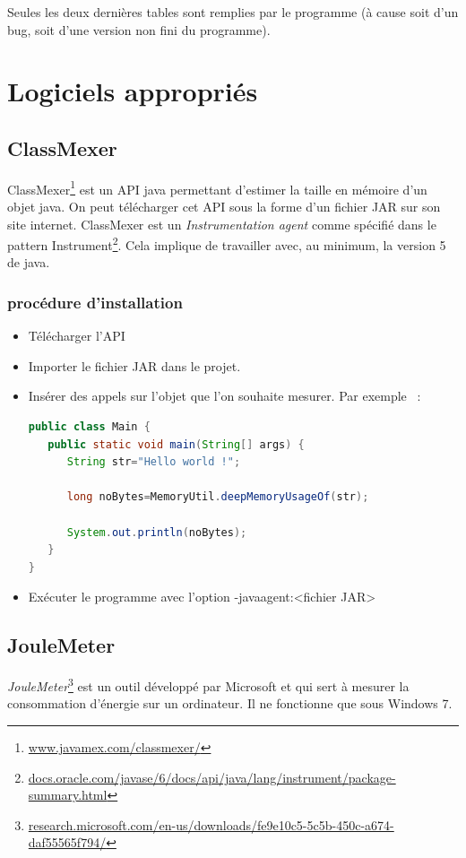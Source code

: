 \documentclass[a4paper, 11pt]{report}
\begin{document}
Seules les deux dernières tables sont remplies par le programme (à cause soit d’un bug, soit d’une version non fini du programme).
	
	\section{Logiciels appropriés}
		\subsection{ClassMexer}
ClassMexer\footnote{\href{http://www.javamex.com/classmexer/}{www.javamex.com/classmexer/}} est un API java permettant d’estimer la taille en mémoire d’un objet java. On peut télécharger cet API sous la forme d’un fichier JAR sur son site internet. ClassMexer est un \textit{Instrumentation agent} comme spécifié dans le pattern Instrument\footnote{\href{http://docs.oracle.com/javase/6/docs/api/java/lang/instrument/package-summary.html}{docs.oracle.com/javase/6/docs/api/java/lang/instrument/package-summary.html}}. Cela implique de travailler avec, au minimum, la version 5 de java.

			\subsubsection{procédure d'installation}
\begin{itemize}
	\item Télécharger l’API
	\item Importer le fichier JAR dans le projet.
	\item Insérer des appels sur l’objet que l’on souhaite mesurer. Par exemple ~:
\begin{lstlisting}[language=Java]
public class Main {
   public static void main(String[] args) {
      String str="Hello world !";

      long noBytes=MemoryUtil.deepMemoryUsageOf(str);

      System.out.println(noBytes);
   }
}
\end{lstlisting}
	\item Exécuter le programme avec l’option -javaagent:<fichier JAR>
\end{itemize}

		\subsection{JouleMeter}
\textit{JouleMeter}\footnote{\href{http://research.microsoft.com/en-us/downloads/fe9e10c5-5c5b-450c-a674-daf55565f794/}{research.microsoft.com/en-us/downloads/fe9e10c5-5c5b-450c-a674-daf55565f794/}} est un outil développé par Microsoft et qui sert à mesurer la consommation d’énergie sur un ordinateur. Il ne fonctionne que sous Windows 7.
\end{document}

